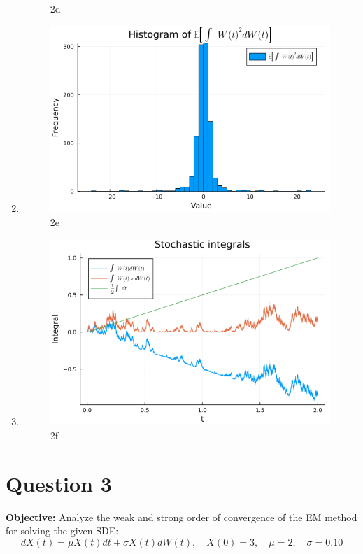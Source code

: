 \documentclass{article}
\begin{document}
\begin{enumerate}
\begin{figure}[H]
            \caption{2d}
            \label{fig:2d}
        \end{figure}
    \item
        \begin{figure}[H]
            \centering
            \includegraphics[scale=0.6]{imgs/2e.png}
            \caption{2e}
            \label{fig:2e}
        \end{figure}

    \item 
        \begin{figure}[H]
            \centering
            \includegraphics[scale=0.6]{imgs/2f.png}
            \caption{2f}
            \label{fig:2f}
        \end{figure}
\end{enumerate}

\section*{Question 3}
 \textbf{Objective:} Analyze the weak and strong order of convergence of the EM method for solving the given SDE:
    \[
    dX(t) = \mu X(t) dt + \sigma X(t) dW(t), \quad X(0)=3, \quad \mu=2 , \quad \sigma=0.10
    \]
\end{document}
